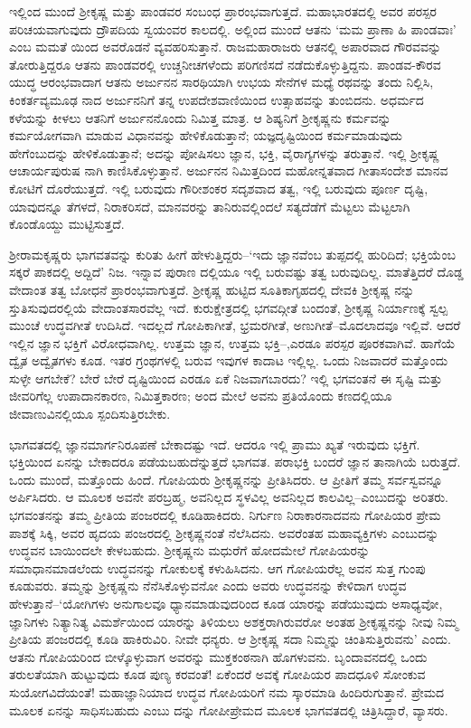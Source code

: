 ಇಲ್ಲಿಂದ ಮುಂದೆ ಶ್ರೀಕೃಷ್ಣ ಮತ್ತು ಪಾಂಡವರ ಸಂಬಂಧ ಪ್ರಾರಂಭವಾಗುತ್ತದೆ. ಮಹಾಭಾರತದಲ್ಲಿ ಅವರ ಪರಸ್ಪರ ಪರಿಚಯವಾಗುವುದು ದ್ರೌಪದಿಯ ಸ್ವಯಂವರ ಕಾಲದಲ್ಲಿ. ಅಲ್ಲಿಂದ ಮುಂದೆ ಆತನು ‘ಮಮ ಪ್ರಾಣಾ ಹಿ ಪಾಂಡವಾಃ’ ಎಂಬ ಮಮತೆ ಯಿಂದ ಅವರೊಡನೆ ವ್ಯವಹರಿಸುತ್ತಾನೆ. ರಾಜಮಹಾರಾಜರು ಆತನಲ್ಲಿ ಅಪಾರವಾದ ಗೌರವವನ್ನು ತೋರುತ್ತಿದ್ದರೂ ಆತನು ಪಾಂಡವರಲ್ಲಿ ಉಚ್ಚನೀಚಗಳೆಂದು ಪರಿಗಣಿಸದೆ ನಡೆದುಕೊಳ್ಳುತ್ತಿದ್ದನು. ಪಾಂಡವ-ಕೌರವ ಯುದ್ಧ ಆರಂಭವಾದಾಗ ಆತನು ಅರ್ಜುನನ ಸಾರಥಿಯಾಗಿ ಉಭಯ ಸೇನೆಗಳ ಮಧ್ಯೆ ರಥವನ್ನು ತಂದು ನಿಲ್ಲಿಸಿ, ಕಿಂಕರ್ತವ್ಯಮೂಢ ನಾದ ಅರ್ಜುನನಿಗೆ ತನ್ನ ಉಪದೇಶವಾಣಿಯಿಂದ ಉತ್ಸಾಹವನ್ನು ತುಂಬಿದನು. ಅಧರ್ಮದ ಕಳೆಯನ್ನು ಕೀಳಲು ಆತನಿಗೆ ಅರ್ಜುನನೊಂದು ನಿಮಿತ್ತ ಮಾತ್ರ. ಆ ಶಿಷ್ಯನಿಗೆ ಶ್ರೀಕೃಷ್ಣನು ಕರ್ಮವನ್ನು ಕರ್ಮಯೋಗವಾಗಿ ಮಾಡುವ ವಿಧಾನವನ್ನು ಹೇಳಿಕೊಡುತ್ತಾನೆ; ಯಜ್ಞದೃಷ್ಟಿಯಿಂದ ಕರ್ಮಮಾಡುವುದು ಹೇಗೆಂಬುದನ್ನು ಹೇಳಿಕೊಡುತ್ತಾನೆ; ಅದನ್ನು ಪೋಷಿಸಲು ಜ್ಞಾನ, ಭಕ್ತಿ, ವೈರಾಗ್ಯಗಳನ್ನು ತರುತ್ತಾನೆ. ಇಲ್ಲಿ ಶ್ರೀಕೃಷ್ಣ ಆಚಾರ್ಯಪುರುಷ ನಾಗಿ ಕಾಣಿಸಿಕೊಳ್ಳುತ್ತಾನೆ. ಅರ್ಜುನನ ನಿಮಿತ್ತದಿಂದ ಮಹೋನ್ನತವಾದ ಗೀತಾಸಂದೇಶ ಮಾನವ ಕೋಟಿಗೆ ದೊರೆಯುತ್ತದೆ. ಇಲ್ಲಿ ಬರುವುದು ಗೌರೀಶಂಕರ ಸದೃಶವಾದ ತತ್ವ, ಇಲ್ಲಿ ಬರುವುದು ಪೂರ್ಣ ದೃಷ್ಟಿ, ಯಾವುದನ್ನೂ ತೆಗಳದೆ, ನಿರಾಕರಿಸದೆ, ಮಾನವರನ್ನು ತಾನಿರುವಲ್ಲಿಂದಲೆ ಸತ್ಯದೆಡೆಗೆ ಮೆಟ್ಟಲು ಮೆಟ್ಟಲಾಗಿ ಕೊಂಡೊಯ್ದು ಮುಟ್ಟಿಸುತ್ತದೆ.

ಶ್ರೀರಾಮಕೃಷ್ಣರು ಭಾಗವತವನ್ನು ಕುರಿತು ಹೀಗೆ ಹೇಳುತ್ತಿದ್ದರು–‘ಇದು ಜ್ಞಾನವೆಂಬ ತುಪ್ಪದಲ್ಲಿ ಹುರಿದಿದೆ; ಭಕ್ತಿಯೆಂಬ ಸಕ್ಕರೆ ಪಾಕದಲ್ಲಿ ಅದ್ದಿದೆ’ ನಿಜ. ಇನ್ನಾವ ಪುರಾಣ ದಲ್ಲಿಯೂ ಇಲ್ಲಿ ಬರುವಷ್ಟು ತತ್ವ ಬರುವುದಿಲ್ಲ. ಮಾತೆತ್ತಿದರೆ ದೊಡ್ಡ ವೇದಾಂತ ತತ್ವ ಬೋಧನೆ ಪ್ರಾರಂಭವಾಗುತ್ತದೆ. ಶ್ರೀಕೃಷ್ಣ ಹುಟ್ಟಿದ ಸೂತಿಕಾಗೃಹದಲ್ಲಿ ದೇವಕಿ ಶ್ರೀಕೃಷ್ಣ ನನ್ನು ಸ್ತುತಿಸುವುದರಲ್ಲಿಯೆ ವೇದಾಂತಸಾರವೆಲ್ಲ ಇದೆ. ಕುರುಕ್ಷೇತ್ರದಲ್ಲಿ ಭಗವದ್ಗೀತೆ ಬಂದಂತೆ, ಶ್ರೀಕೃಷ್ಣ ನಿರ್ಯಾಣಕ್ಕೆ ಸ್ವಲ್ಪ ಮುಂಚೆ ಉದ್ಧವಗೀತೆ ಉದಿಸಿದೆ. ಇದಲ್ಲದೆ ಗೋಪಿಕಾಗೀತೆ, ಭ್ರಮರಗೀತೆ, ಅಣುಗೀತೆ–ಮೊದಲಾದವೂ ಇಲ್ಲಿವೆ. ಆದರೆ ಇಲ್ಲಿನ ಜ್ಞಾನ ಭಕ್ತಿಗೆ ವಿರೋಧವಾಗಿಲ್ಲ. ಉತ್ತಮ ಜ್ಞಾನ, ಉತ್ತಮ ಭಕ್ತಿ–,ಎರಡೂ ಪರಸ್ಪರ ಪೂರಕವಾಗಿವೆ. ಹಾಗೆಯೆ ದ್ವೈತ ಅದ್ವೈತಗಳು ಕೂಡ. ಇತರ ಗ್ರಂಥಗಳಲ್ಲಿ ಬರುವ ಇವುಗಳ ಕಾದಾಟ ಇಲ್ಲಿಲ್ಲ. ಒಂದು ನಿಜವಾದರೆ ಮತ್ತೊಂದು ಸುಳ್ಳೇ ಆಗಬೇಕೆ? ಬೇರೆ ಬೇರೆ ದೃಷ್ಟಿಯಿಂದ ಎರಡೂ ಏಕೆ ನಿಜವಾಗಬಾರದು? ಇಲ್ಲಿ ಭಗವಂತನೆ ಈ ಸೃಷ್ಟಿ ಮತ್ತು ಜೀವರಿಗೆಲ್ಲ ಉಪಾದಾನಕಾರಣ, ನಿಮಿತ್ತಕಾರಣ; ಅಂದ ಮೇಲೆ ಅವನು ಪ್ರತಿಯೊಂದು ಕಣದಲ್ಲಿಯೂ ಜೀವಾಣುವಿನಲ್ಲಿಯೂ ಸ್ಪಂದಿಸುತ್ತಿರಬೇಕು.

ಭಾಗವತದಲ್ಲಿ ಜ್ಞಾನಮಾರ್ಗನಿರೂಪಣೆ ಬೇಕಾದಷ್ಟು ಇದೆ. ಆದರೂ ಇಲ್ಲಿ ಪ್ರಾಮು ಖ್ಯತೆ ಇರುವುದು ಭಕ್ತಿಗೆ. ಭಕ್ತಿಯಿಂದ ಏನನ್ನು ಬೇಕಾದರೂ ಪಡೆಯಬಹುದೆನ್ನುತ್ತದೆ ಭಾಗವತ. ಪರಾಭಕ್ತಿ ಬಂದರೆ ಜ್ಞಾನ ತಾನಾಗಿಯೆ ಬರುತ್ತದೆ. ಒಂದು ಮುಂದೆ, ಮತ್ತೊಂದು ಹಿಂದೆ. ಗೋಪಿಯರು ಶ್ರೀಕೃಷ್ಣನನ್ನು ಪ್ರೀತಿಸಿದರು. ಆ ಪ್ರೀತಿಗೆ ತಮ್ಮ ಸರ್ವಸ್ವವನ್ನೂ ಅರ್ಪಿಸಿದರು. ಆ ಮೂಲಕ ಅವನೇ ಪರಬ್ರಹ್ಮ, ಅವನಿಲ್ಲದ ಸ್ಥಳವಿಲ್ಲ ಅವನಿಲ್ಲದ ಕಾಲವಿಲ್ಲ–ಎಂಬುದನ್ನು ಅರಿತರು. ಭಗವಂತನನ್ನು ತಮ್ಮ ಪ್ರೀತಿಯ ಪಂಜರದಲ್ಲಿ ಕೂಡಿಹಾಕಿದರು. ನಿರ್ಗುಣ ನಿರಾಕಾರನಾದವನು ಗೋಪಿಯರ ಪ್ರೇಮ ಪಾಶಕ್ಕೆ ಸಿಕ್ಕಿ, ಅವರ ಹೃದಯ ಪಂಜರದಲ್ಲಿ ಶ್ರೀಕೃಷ್ಣನಂತೆ ನೆಲೆಸಿದನು. ಅವರೆಂತಹ ಮಹಾವ್ಯಕ್ತಿಗಳು ಎಂಬುದನ್ನು ಉದ್ಧವನ ಬಾಯಿಂದಲೇ ಕೇಳಬಹುದು. ಶ್ರೀಕೃಷ್ಣನು ಮಧುರೆಗೆ ಹೋದಮೇಲೆ ಗೋಪಿಯರನ್ನು ಸಮಾಧಾನಮಾಡಲೆಂದು ಉದ್ಧವನನ್ನು ಗೋಕುಲಕ್ಕೆ ಕಳುಹಿಸಿದನು. ಆಗ ಗೋಪಿಯರೆಲ್ಲ ಅವನ ಸುತ್ತ ಗುಂಪು ಕೂಡುವರು. ತಮ್ಮನ್ನು ಶ್ರೀಕೃಷ್ಣನು ನೆನೆಸಿಕೊಳ್ಳುವನೋ ಎಂದು ಅವರು ಉದ್ಧವನನ್ನು ಕೇಳಿದಾಗ ಉದ್ಧವ ಹೇಳುತ್ತಾನೆ–‘ಯೋಗಿಗಳು ಅನುಗಾಲವೂ ಧ್ಯಾನಮಾಡುವುದರಿಂದ ಕೂಡ ಯಾರನ್ನು ಪಡೆಯುವುದು ಅಸಾಧ್ಯವೋ, ಜ್ಞಾನಿಗಳು ನಿತ್ಯಾನಿತ್ಯ ವಿಮರ್ಶೆಯಿಂದ ಯಾರನ್ನು ತಿಳಿಯಲು ಅಶಕ್ತರಾಗಿರುವರೋ ಅಂತಹ ಶ್ರೀಕೃಷ್ಣನನ್ನು ನೀವು ನಿಮ್ಮ ಪ್ರೀತಿಯ ಪಂಜರದಲ್ಲಿ ಕೂಡಿ ಹಾಕಿರುವಿರಿ. ನೀವೇ ಧನ್ಯರು. ಆ ಶ್ರೀಕೃಷ್ಣ ಸದಾ ನಿಮ್ಮನ್ನು ಚಿಂತಿಸುತ್ತಿರುವನು’ ಎಂದು. ಆತನು ಗೋಪಿಯರಿಂದ ಬೀಳ್ಕೊಳ್ಳುವಾಗ ಅವರನ್ನು ಮುಕ್ತಕಂಠನಾಗಿ ಹೊಗಳುವನು. ಬೃಂದಾವನದಲ್ಲಿ ಒಂದು ತರುಲತೆಯಾಗಿ ಹುಟ್ಟುವುದು ಕೂಡ ಪುಣ್ಯ ಕರವಂತೆ! ಏಕೆಂದರೆ ಅವಕ್ಕೆ ಗೋಪಿಯರ ಪಾದಧೂಳಿ ಸೋಂಕುವ ಸುಯೋಗವಿದೆಯಂತೆ! ಮಹಾಜ್ಞಾನಿಯಾದ ಉದ್ಧವ ಗೋಪಿಯರಿಗೆ ನಮ ಸ್ಕಾರಮಾಡಿ ಹಿಂದಿರುಗುತ್ತಾನೆ. ಪ್ರೇಮದ ಮೂಲಕ ಏನನ್ನು ಸಾಧಿಸಬಹುದು ಎಂಬು ದನ್ನು ಗೋಪೀಪ್ರೇಮದ ಮೂಲಕ ಭಾಗವತದಲ್ಲಿ ಚಿತ್ರಿಸಿದ್ದಾರೆ, ವ್ಯಾಸರು.

